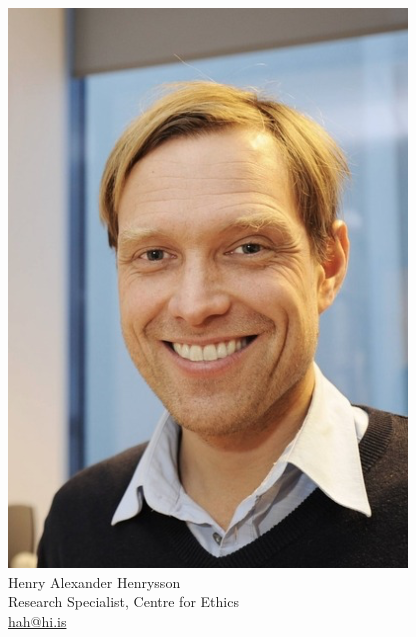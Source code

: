 \documentclass[
    NAME={Dr. Helga Ingimundardóttir},
    EMAIL={helgaingim@hi.is},
    FACULTY={Industrial Engineering},
    TITLE={Business Intelligence},
    SUBTITLE={Introduction},
    SEMINAR={IÐN610M},
    DATE={Spring, 2024}
]{HI-LaTeX/hi-beamer}
\begin{document}
\begin{frame}
\begin{figure}
\begin{minipage}[t]{0.3\textwidth}
                \includegraphics[width=\linewidth]{figures/hah}
                Henry Alexander Henrysson \\
                Research Specialist, Centre for Ethics \\
                \url{hah@hi.is}
            \end{minipage}
        \end{figure}

    \end{frame}
\end{document}

